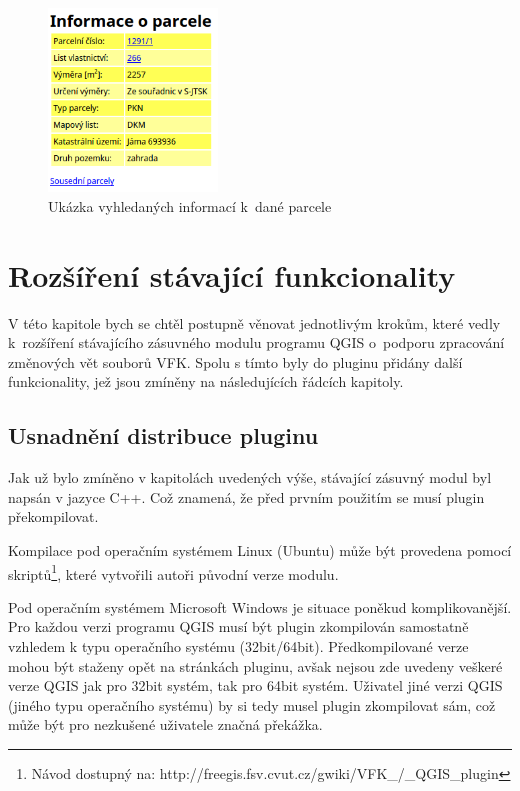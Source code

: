 \documentclass[a4paper,12pt,oneside]{book}
\begin{document}
\begin{figure}[htb]
\centering
\includegraphics[width=0.4\textwidth]{images/vfkPlugin-informace_o_parcele.png}
\caption[Ukázka vyhledaných informací k dané parcele]{Ukázka vyhledaných informací k~dané parcele}
\label{l_informace_o_parcele}
\end{figure}



\clearpage
\chapter{Rozšíření stávající funkcionality}
V této kapitole bych se chtěl postupně věnovat jednotlivým krokům, které vedly k~rozšíření stávajícího zásuvného modulu programu QGIS o~podporu zpracování změnových vět souborů VFK. Spolu s tímto byly do pluginu přidány další funkcionality, jež jsou zmíněny na následujících řádcích kapitoly. 

\section{Usnadnění distribuce pluginu}
Jak už bylo zmíněno v kapitolách uvedených výše, stávající zásuvný modul byl napsán v jazyce C++. Což znamená, že před prvním použitím se musí plugin překompilovat. 

Kompilace pod operačním systémem Linux (Ubuntu) může být provedena pomocí skriptů\footnote{Návod dostupný na: http://freegis.fsv.cvut.cz/gwiki/VFK\_/\_QGIS\_plugin}, které vytvořili autoři původní verze modulu. 

Pod operačním systémem Microsoft Windows je situace poněkud komplikovanější. Pro každou verzi programu QGIS musí být plugin zkompilován samostatně vzhledem k typu operačního systému (32bit/64bit). Předkompilované verze mohou být staženy opět na stránkách pluginu, avšak nejsou zde uvedeny veškeré verze QGIS jak pro 32bit systém, tak pro 64bit systém. Uživatel jiné verzi QGIS (jiného typu operačního systému) by si tedy musel plugin zkompilovat sám, což může být pro nezkušené uživatele značná překážka. 
\end{document}
